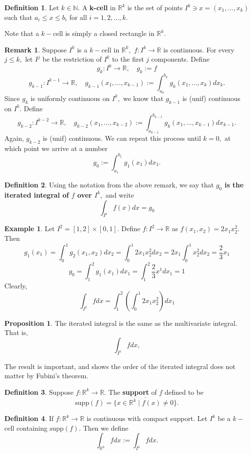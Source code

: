 \documentclass[10pt, oneside]{article}
\newcommand{\bbR}{\mathbb{R}}
\newcommand{\bbN}{\mathbb{N}}
\theoremstyle{definition}
\newtheorem{exmp}{Example}[section]
\newtheorem{defn}{Definition}
\newtheorem{prop}{Proposition}
\newtheorem{rem}{Remark}
\begin{document}
\begin{defn}
    Let $k \in \bbN.$ A \textbf{k-cell} in $\bbR^k$ is the set of points $I^k\ni x = (x_1, \dots, x_k)$ such that $a_i \leq x \leq b_i$ for all $i  = 1, 2,\dots, k.$
\end{defn}
Note that a $k-$cell is simply a closed rectangle in $\bbR^k.$ 
\begin{rem}
    Suppose $I^k$ is a $k-$cell in $\bbR^k,$ $f: I^k \to \bbR$ is continuous. For every $j \leq k,$ let $I^j$ be the restriction of $I^k$ to the first $j$ components. Define 
    \[g_k: I^k \to \bbR, \quad g_k := f\]
    \[g_{k-1}: I^{k-1} \to \bbR, \quad g_{k-1}(x_1, \dots, x_{k-1}) :=  \int_{a_k}^{b_k} g_k(x_1, \dots, x_k) dx_k.\] Since $g_k$ is uniformly continuous on $I^k,$ we know that $g_{k-1}$ is (unif) continuous on $I^k.$ Define
    \[g_{k-2}: I^{k-2} \to \bbR, \quad g_{k-2}(x_1, \dots, x_{k-2}) :=  \int_{a_{k-1}}^{b_{k-1}} g_k(x_1, \dots, x_{k-1}) dx_{k-1}.\] Again, $g_{k-2}$ is (unif) continuous. We can repeat this process until $k= 0,$ at which point  we arrive at a number
    \[g_0:= \int_{a_1}^{b_1} g_1(x_1) dx_1.\]
\end{rem}
\begin{defn}
    Using the notation from the above remark, we say that \textbf{$g_0$ is the iterated integral of $f$ over $I^k,$} and write 
    \[\int_{I^k}f(x)dx = g_0\]
\end{defn}
\begin{exmp}
    Let $I^2 = [1,2] \times [0,1].$ Define $f: I^2 \to \bbR$ as $f(x_1, x_2) = 2x_1 x_2^2.$ Then 
    \[g_1(x_1) = \int_0^1 g_2(x_1, x_2)dx_2 = \int_0^1 2x_1x_2^2 dx_2 = 2x_1 \int_0^1 x_2^2 dx_2= \frac{2}{3}x_1\]
    \[g_0 = \int_1^2 g_1(x_1)dx_1 = \int_1^2 \frac{2}{3}x^1 dx_1= 1\]
    Clearly, 
    \[\int_{I^2}fdx = \int_1^2 \left(\int_0^1 2x_1 x_2^2\right)dx_1\]
\end{exmp}
\begin{prop}
    The iterated integral is the same as the multivariate integral. That is, 
    \[\int_{I^k} fdx,\]
\end{prop}
The result is important, and shows the order of the iterated integral does not matter by Fubini's theorem.

\begin{defn}
    Suppose $f: \bbR^k \to \bbR.$ The \textbf{support} of $f$ defined to be \[\text{supp}(f) = \overline{\{x \in \bbR^k \mid f(x) \neq 0\}}.\] 
\end{defn}
\begin{defn}
    If $f: \bbR^k \to \bbR$ is continuous with compact support. Let $I^k$ be a $k-$cell containing $\text{supp}(f).$ Then we define 
    \[\int_{\bbR^k} fdx := \int_{I^k}f dx.\]
\end{defn}
\end{document}
